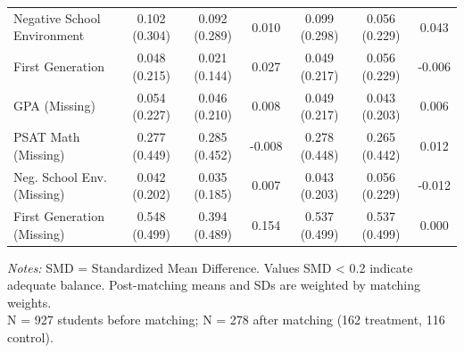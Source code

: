 \begin{table}[t]
\begin{tabular*}{\linewidth}{@{\extracolsep{\fill}}lcccccc}
Negative School Environment & 0.102 (0.304) & 0.092 (0.289) & 0.010 & 0.099 (0.298) & 0.056 (0.229) & 0.043 \\ 
First Generation & 0.048 (0.215) & 0.021 (0.144) & 0.027 & 0.049 (0.217) & 0.056 (0.229) & -0.006 \\ 
{GPA (Missing)} & {0.054 (0.227)} & {0.046 (0.210)} & {0.008} & {0.049 (0.217)} & {0.043 (0.203)} & {0.006} \\ 
PSAT Math (Missing) & 0.277 (0.449) & 0.285 (0.452) & -0.008 & 0.278 (0.448) & 0.265 (0.442) & 0.012 \\ 
Neg. School Env. (Missing) & 0.042 (0.202) & 0.035 (0.185) & 0.007 & 0.043 (0.203) & 0.056 (0.229) & -0.012 \\ 
{First Generation (Missing)} & {0.548 (0.499)} & {0.394 (0.489)} & {0.154} & {0.537 (0.499)} & {0.537 (0.499)} & {0.000} \\ 
\bottomrule
\end{tabular*}
\begin{minipage}{\linewidth}
\vspace{.05em}
\emph{Notes:} SMD = Standardized Mean Difference. Values \textbar{}SMD\textbar{} \textless{} 0.2 indicate adequate balance. Post-matching means and SDs are weighted by matching weights.\\
N = 927 students before matching; N = 278 after matching (162 treatment, 116 control).\\
\end{minipage}
\end{table}

